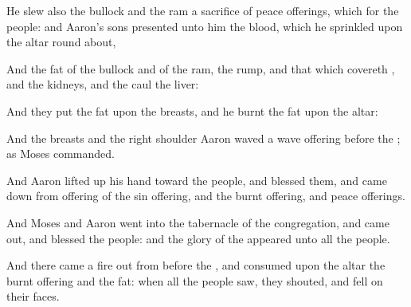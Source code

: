 {He
slew also the
bullock and the
ram
{} a
sacrifice of peace
offerings, which
{} for the
people: and
Aaron’s
sons
presented unto him the
blood, which he
sprinkled upon the
altar round
about,

And the
fat of the
bullock and of the
ram, the
rump, and that which
covereth
{}, and the
kidneys, and the
caul
{} the
liver:

And they
put the
fat upon the
breasts, and he
burnt the
fat upon the
altar:

And the
breasts and the
right
shoulder
Aaron
waved
{} a wave
offering
before the
{}; as
Moses
commanded.

And
Aaron lifted
up his
hand toward the
people, and
blessed them, and came
down from
offering of the sin
offering, and the burnt
offering, and peace
offerings.


\par }{\PP {}And
Moses and
Aaron
went into the
tabernacle of the
congregation, and came
out, and
blessed the
people: and the
glory of the
{}
appeared unto all the
people.

And there
came a
fire out from
before the
{}, and
consumed upon the
altar the burnt
offering and the
fat:
{} when all the
people
saw, they
shouted, and
fell on their
faces.




\par }
